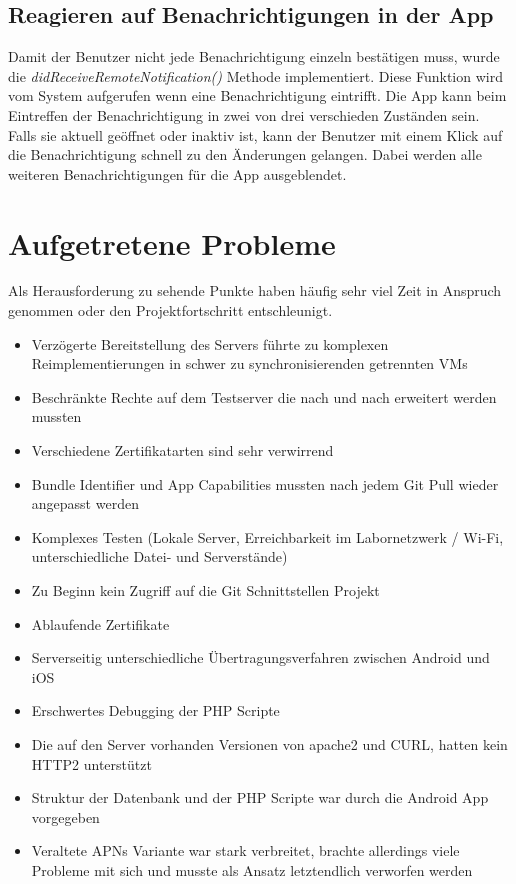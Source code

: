 \newpage

\subsection{Reagieren auf Benachrichtigungen in der App}
Damit der Benutzer nicht jede Benachrichtigung einzeln bestätigen muss, wurde die \textit{didReceiveRemoteNotification()} Methode implementiert. Diese Funktion wird vom System aufgerufen wenn eine Benachrichtigung eintrifft. Die App kann beim Eintreffen der Benachrichtigung in zwei von drei verschieden Zuständen sein. Falls sie aktuell geöffnet oder inaktiv ist, kann der Benutzer mit einem Klick auf die Benachrichtigung schnell zu den Änderungen gelangen. 
Dabei werden alle weiteren Benachrichtigungen für die App ausgeblendet.
\\



\newpage

\section{Aufgetretene Probleme}
Als Herausforderung zu sehende Punkte haben häufig sehr viel Zeit in Anspruch genommen oder den Projektfortschritt entschleunigt.


\begin{itemize}
\item Verzögerte Bereitstellung des Servers führte zu komplexen Reimplementierungen in schwer zu synchronisierenden getrennten VMs
\item Beschränkte Rechte auf dem Testserver die nach und nach erweitert werden mussten
\item Verschiedene Zertifikatarten sind sehr verwirrend
\item Bundle Identifier und App Capabilities mussten nach jedem Git Pull wieder angepasst werden
\item Komplexes Testen (Lokale Server, Erreichbarkeit im Labornetzwerk / Wi-Fi, unterschiedliche Datei- und Serverstände) 
\item Zu Beginn kein Zugriff auf die Git Schnittstellen Projekt
\item Ablaufende Zertifikate
\item Serverseitig unterschiedliche Übertragungsverfahren zwischen Android und iOS
\item Erschwertes Debugging der PHP Scripte
\item Die auf den Server vorhanden Versionen von apache2 und CURL, hatten kein HTTP2 unterstützt  
\item Struktur der Datenbank und der PHP Scripte war durch die Android App vorgegeben
\item Veraltete APNs Variante war stark verbreitet, brachte allerdings viele Probleme mit sich und musste als Ansatz letztendlich verworfen werden
\end{itemize}

